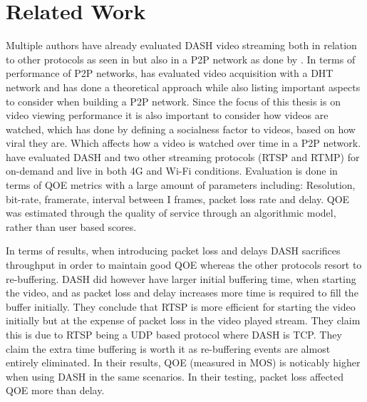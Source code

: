 \chapter{Related Work}
\label{cha:related-work}

Multiple authors have already evaluated \ac{DASH} video streaming both in relation to other protocols as seen in \citeauthor{aloman2015performance} but also in a \ac{P2P} network as done by \citeauthor{gazdar2017toward}. In terms of performance of \ac{P2P} networks, \citeauthor{nguyen2009p2p} has evaluated video acquisition with a \ac{DHT} network and \citeauthor{qiu2004modeling} has done a theoretical approach while also listing important aspects to consider when building a \ac{P2P} network. Since the focus of this thesis is on video viewing performance it is also important to consider how videos are watched, which \citeauthor{broxton2013catching} has done by defining a socialness factor to videos, based on how viral they are. Which affects how a video is watched over time in a \ac{P2P} network.
\\


\citeauthor{aloman2015performance} \cite{aloman2015performance} have evaluated \ac{DASH} and two other streaming protocols (\ac{RTSP} and \ac{RTMP}) for on-demand and live in both 4G and Wi-Fi conditions. Evaluation is done in terms of \ac{QOE} metrics with a large amount of parameters including: Resolution, bit-rate, framerate, interval between I frames, packet loss rate and delay. \ac{QOE} was estimated through the quality of service through an algorithmic model, rather than user based scores.

In terms of results, when introducing packet loss and delays \ac{DASH} sacrifices throughput in order to maintain good \ac{QOE} whereas the other protocols resort to re-buffering. \ac{DASH} did however have larger initial buffering time, when starting the video, and as packet loss and delay increases more time is required to fill the buffer initially. They conclude that \ac{RTSP} is more efficient for starting the video initially but at the expense of packet loss in the video played stream. They claim this is due to \ac{RTSP} being a \ac{UDP} based protocol where \ac{DASH} is \ac{TCP}. They claim the extra time buffering is worth it as re-buffering events are almost entirely eliminated. In their results, \ac{QOE} (measured in \ac{MOS}) is noticably higher when using \ac{DASH} in the same scenarios. In their testing, packet loss affected \ac{QOE} more than delay.
\\


